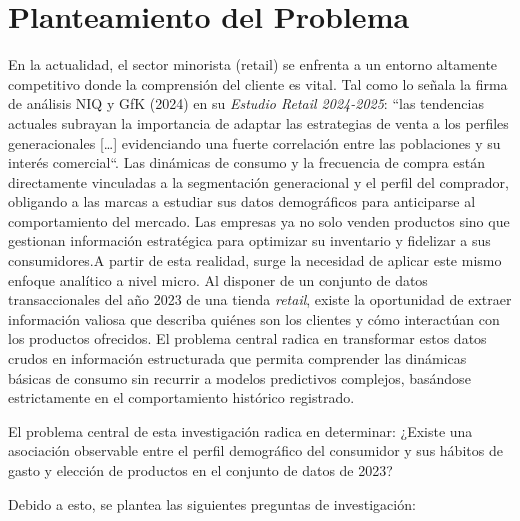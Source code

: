 \documentclass[oneside,11pt]{Latex/Classes/PhDthesisPSnPDF}
\begin{document}
  \cleardoublepage

\mainmatter
\def\baselinestretch{1.5}

\newpage
{}
\vspace*{1cm}

\chapter{Planteamiento del Problema}

En la actualidad, el sector minorista (retail) se enfrenta a un entorno
altamente competitivo donde la comprensión del cliente es vital. Tal
como lo señala la firma de análisis NIQ y GfK (2024) en su
\textit{Estudio Retail 2024-2025}: ``las tendencias actuales subrayan la
importancia de adaptar las estrategias de venta a los perfiles
generacionales {[}\ldots{]} evidenciando una fuerte correlación entre
las poblaciones y su interés comercial``. Las dinámicas de consumo y la
frecuencia de compra están directamente vinculadas a la segmentación
generacional y el perfil del comprador, obligando a las marcas a
estudiar sus datos demográficos para anticiparse al comportamiento del
mercado. Las empresas ya no solo venden productos sino que gestionan
información estratégica para optimizar su inventario y fidelizar a sus
consumidores.A partir de esta realidad, surge la necesidad de aplicar
este mismo enfoque analítico a nivel micro. Al disponer de un conjunto
de datos transaccionales del año 2023 de una tienda \emph{retail},
existe la oportunidad de extraer información valiosa que describa
quiénes son los clientes y cómo interactúan con los productos ofrecidos.
El problema central radica en transformar estos datos crudos en
información estructurada que permita comprender las dinámicas básicas de
consumo sin recurrir a modelos predictivos complejos, basándose
estrictamente en el comportamiento histórico registrado.

El problema central de esta investigación radica en determinar: ¿Existe
una asociación observable entre el perfil demográfico del consumidor y
sus hábitos de gasto y elección de productos en el conjunto de datos de
2023?

Debido a esto, se plantea las siguientes preguntas de investigación:\\
\end{document}
